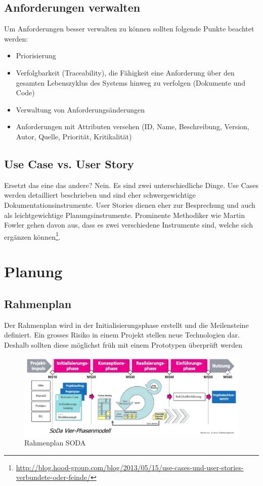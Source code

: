 \subsection{Anforderungen verwalten}

Um Anforderungen besser verwalten zu können sollten folgende Punkte beachtet werden:
\begin{itemize}
	\item Priorisierung
	\item Verfolgbarkeit (Traceability), die Fähigkeit eine Anforderung über den gesamten Lebenszyklus des Systems hinweg zu verfolgen (Dokumente und Code)
	\item Verwaltung von Anforderungsänderungen
	\item Anforderungen mit Attributen versehen (ID, Name, Beschreibung, Version, Autor, Quelle, Priorität, Kritikalität) 
\end{itemize}

\subsection{Use Case vs. User Story}
Ersetzt das eine das andere? Nein. Es sind zwei unterschiedliche Dinge. Use Cases werden detailliert beschrieben und sind eher schwergewichtige Dokumentationsinstrumente. User Stories dienen eher zur Besprechung und auch als leichtgewichtige Planungsinstrumente. Prominente Methodiker wie Martin Fowler gehen davon aus, dass es zwei verschiedene Instrumente sind, welche sich ergänzen können\footnote{\href{http://blog.hood-group.com/blog/2013/05/15/use-cases-und-user-stories-verbundete-oder-feinde/}{http://blog.hood-group.com/blog/2013/05/15/use-cases-und-user-stories-verbundete-oder-feinde/}}.

\section{Planung}

\subsection{Rahmenplan}

Der Rahmenplan wird in der Initialisierungsphase erstellt und die Meilensteine definiert. Ein grosses Risiko in einem Projekt stellen neue Technologien dar. Deshalb sollten diese möglichst früh mit einem Prototypen überprüft werden

\begin{figure}[h!]
\centering
\includegraphics[width=0.8\linewidth]{fig/rahmenplan}
\caption{Rahmenplan SODA}
\label{fig:rahmenplan}
\end{figure}

